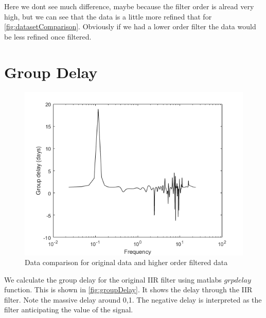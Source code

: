 Here we dont see much difference, maybe because the filter order is alread very high, but we can see that the data is a little more refined that for \autoref{fig:datasetComparison}.
Obviously if we had a lower order filter the data would be less refined once filtered.



\newpage

\section{Group Delay}


\begin{figure}[h]
  \centering
  \includegraphics[scale=0.60]{matlabStuff/groupDelay.png}
  \caption{Data comparison for original data and higher order filtered data}%
  \label{fig:groupDelay}
\end{figure}

We calculate the group delay for the original IIR filter using matlabs $grpdelay$ function. This is shown in \autoref{fig:groupDelay}. It shows the delay through the IIR filter. Note the massive delay around 0,1. The negative delay is interpreted as the filter anticipating the value of the signal.

\newpage